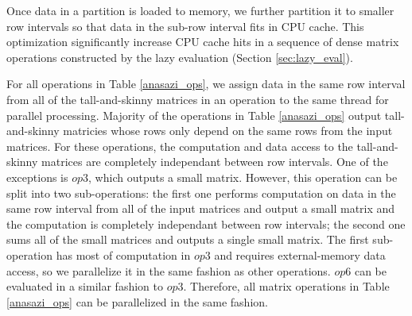Once data in a partition is loaded to memory, we further partition it to
smaller row intervals so that data
in the sub-row interval fits in CPU cache.  This optimization significantly
increase CPU cache hits in a sequence of dense matrix operations constructed by
the lazy evaluation (Section \ref{sec:lazy_eval}).

For all operations in Table \ref{anasazi_ops}, we assign data in the same row
interval from all of the tall-and-skinny
matrices in an operation to the same thread for parallel processing.
Majority of the operations in Table \ref{anasazi_ops} output tall-and-skinny
matricies whose rows only depend on the same rows from the input matrices.
For these operations, the computation and data access to the tall-and-skinny
matrices are completely independant between row intervals. One of the exceptions is
$op3$, which outputs a small matrix. However, this operation can be split into
two sub-operations: the first one performs computation on data in the same row
interval from all of the input matrices and output a small matrix and the computation
is completely independant between row intervals; the second one sums all of
the small matrices and outputs a single small matrix. The first sub-operation
has most of computation in $op3$ and requires external-memory data access,
so we parallelize it in the same fashion as other operations.
$op6$ can be evaluated in a similar fashion to $op3$. Therefore, all matrix
operations in Table \ref{anasazi_ops} can be parallelized in the same fashion.


